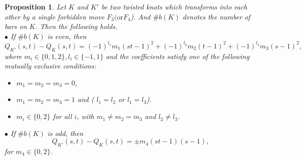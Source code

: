 \documentclass[10pt,a4paper,reqno]{amsart}
\newtheorem{proposition}[theorem]{Proposition}
\theoremstyle{definition}
\theoremstyle{remark}
\begin{document}
	\begin{proposition}\label{pr:for3}
		Let $K$ and $K'$ be two twisted knots which transforms into each
		other by a single forbidden move $F_3(\text{or} F_4$).  And $\# b(K)$ denotes the number of bars on $K$. Then the following holds.\\
			$\bullet$ If $\#b(K)$ is even, then
			$$Q_{K'}(s,t)-Q_{K}(s,t)
			=(-1)^{l_{1}} m_{1}(st-1)^{2}+(-1)^{l_{2}} m_{2}(t-1)^{2}+(-1)^{l_{3}}m_{3}(s-1)^{2},
			$$
		where $m_i \in \{0,1,2\}, l_{i}\in \{-1,1\}$ and the
		coefficients satisfy one of the following mutually exclusive conditions:
		\begin{itemize}
			\item[(i)] $m_1=m_2=m_3=0$,
			\item[(ii)] $m_1=m_2=m_3=1$ and 
			( $l_1=l_2$ or $l_1=l_3$).
			\item[(iii)] $m_i\in\{0,2\}$ for all $i$, with $m_1\neq m_2=m_3$ and
			$l_2\neq l_3$.
		\end{itemize}
	$\bullet$ If $\# b(K)$ is odd, then
			$$Q_{K'}(s,t)-Q_{K}(s,t)=
			\pm m_{4}(st-1)(s-1),	$$
			for $m_{4}\in \{0,2\}$.
	\end{proposition}
\end{document}
